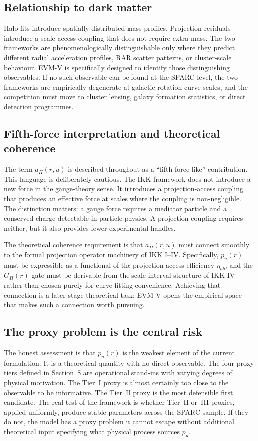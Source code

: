 \documentclass[11pt,a4paper,oneside]{article}
\newcommand{\aPi}{a_{\Pi}}
\newcommand{\pu}{p_u}
\newcommand{\usc}{u}                    %
\newcommand{\etaab}{\eta_{ab}}
\newcommand{\GPi}{G_{\Pi}}
\begin{document}
\subsection{Relationship to dark matter}

Halo fits introduce spatially distributed mass profiles. Projection residuals introduce
a scale-access coupling that does not require extra mass. The two frameworks are
phenomenologically distinguishable only where they predict different radial acceleration
profiles, RAR scatter patterns, or cluster-scale behaviour. EVM-V is specifically
designed to identify those distinguishing observables. If no such observable can be
found at the SPARC level, the two frameworks are empirically degenerate at galactic
rotation-curve scales, and the competition must move to cluster lensing, galaxy
formation statistics, or direct detection programmes.

\subsection{Fifth-force interpretation and theoretical coherence}

The term $\aPi(r,\usc)$ is described throughout as a ``fifth-force-like'' contribution.
This language is deliberately cautious. The IKK framework does not introduce a new
force in the gauge-theory sense. It introduces a projection-access coupling that
produces an effective force at scales where the coupling is non-negligible. The
distinction matters: a gauge force requires a mediator particle and a conserved charge
detectable in particle physics. A projection coupling requires neither, but it also
provides fewer experimental handles.

The theoretical coherence requirement is that $\aPi(r,\usc)$ must connect smoothly to
the formal projection operator machinery of IKK I--IV. Specifically, $\pu(r)$ must be
expressible as a functional of the projection access efficiency $\etaab$, and the
$\GPi(r)$ gate must be derivable from the scale interval structure of IKK IV rather
than chosen purely for curve-fitting convenience. Achieving that connection is a
later-stage theoretical task; EVM-V opens the empirical space that makes such a
connection worth pursuing.

\subsection{The proxy problem is the central risk}

The honest assessment is that $\pu(r)$ is the weakest element of the current
formulation. It is a theoretical quantity with no direct observable. The four proxy
tiers defined in Section~8 are operational stand-ins with varying degrees of physical
motivation. The Tier~I proxy is almost certainly too close to the observable to be
informative. The Tier~II proxy is the most defensible first candidate. The real test of
the framework is whether Tier~II or~III proxies, applied uniformly, produce stable
parameters across the SPARC sample. If they do not, the model has a proxy problem it
cannot escape without additional theoretical input specifying what physical process
sources $\pu$.
\end{document}
